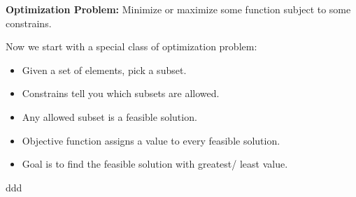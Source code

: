 \begin{definition}
\textbf{Optimization Problem:} Minimize or maximize some function subject to 
some constrains.
\end{definition}

Now we start with a special class of optimization problem:

\begin{itemize}
 \item Given a set of elements, pick a subset.
 \item Constrains tell you which subsets are allowed.
 \item Any allowed subset is a feasible solution.
 \item Objective function assigns a value to every feasible solution.
 \item Goal is to find the feasible solution with greatest/ least value.
\end{itemize}
ddd
